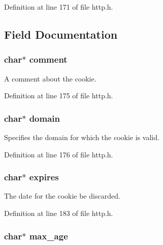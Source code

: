 Definition at line 171 of file http.h.



\subsection{Field Documentation}
\hypertarget{structorion__cookie_a25dae25c3bf9b28d54eb4df7afb2a491}{
\subsubsection[{comment}]{\setlength{\rightskip}{0pt plus 5cm}char$\ast$ {\bf comment}}}
\label{structorion__cookie_a25dae25c3bf9b28d54eb4df7afb2a491}


A comment about the cookie. 



Definition at line 175 of file http.h.

\hypertarget{structorion__cookie_ac7098a8cde5110cd169c9958dca2d4d0}{
\subsubsection[{domain}]{\setlength{\rightskip}{0pt plus 5cm}char$\ast$ {\bf domain}}}
\label{structorion__cookie_ac7098a8cde5110cd169c9958dca2d4d0}


Specifies the domain for which the cookie is valid. 



Definition at line 176 of file http.h.

\hypertarget{structorion__cookie_adb985222d6fc3d8bfb737c259d138366}{
\subsubsection[{expires}]{\setlength{\rightskip}{0pt plus 5cm}char$\ast$ {\bf expires}}}
\label{structorion__cookie_adb985222d6fc3d8bfb737c259d138366}


The date for the cookie be discarded. 



Definition at line 183 of file http.h.

\hypertarget{structorion__cookie_aebc91fcebea283d9fa426edad5d89355}{
\subsubsection[{max\_\-age}]{\setlength{\rightskip}{0pt plus 5cm}char$\ast$ {\bf max\_\-age}}}
\label{structorion__cookie_aebc91fcebea283d9fa426edad5d89355}


